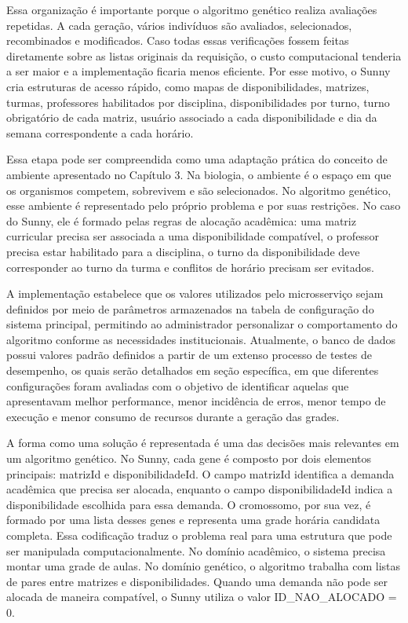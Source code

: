 Essa organização é importante porque o algoritmo genético realiza avaliações repetidas. A cada geração, vários indivíduos são avaliados, selecionados, recombinados e modificados. Caso todas essas verificações fossem feitas diretamente sobre as listas originais da requisição, o custo computacional tenderia a ser maior e a implementação ficaria menos eficiente. Por esse motivo, o Sunny cria estruturas de acesso rápido, como mapas de disponibilidades, matrizes, turmas, professores habilitados por disciplina, disponibilidades por turno, turno obrigatório de cada matriz, usuário associado a cada disponibilidade e dia da semana correspondente a cada horário.

Essa etapa pode ser compreendida como uma adaptação prática do conceito de ambiente apresentado no Capítulo 3. Na biologia, o ambiente é o espaço em que os organismos competem, sobrevivem e são selecionados. No algoritmo genético, esse ambiente é representado pelo próprio problema e por suas restrições. No caso do Sunny, ele é formado pelas regras de alocação acadêmica: uma matriz curricular precisa ser associada a uma disponibilidade compatível, o professor precisa estar habilitado para a disciplina, o turno da disponibilidade deve corresponder ao turno da turma e conflitos de horário precisam ser evitados.

A implementação estabelece que os valores utilizados pelo microsserviço sejam definidos por meio de parâmetros armazenados na tabela de configuração do sistema principal, permitindo ao administrador personalizar o comportamento do algoritmo conforme as necessidades institucionais. Atualmente, o banco de dados possui valores padrão definidos a partir de um extenso processo de testes de desempenho, os quais serão detalhados em seção específica, em que diferentes configurações foram avaliadas com o objetivo de identificar aquelas que apresentavam melhor performance, menor incidência de erros, menor tempo de execução e menor consumo de recursos durante a geração das grades.

A forma como uma solução é representada é uma das decisões mais relevantes em um algoritmo genético. No Sunny, cada gene é composto por dois elementos principais: matrizId e disponibilidadeId. O campo matrizId identifica a demanda acadêmica que precisa ser alocada, enquanto o campo disponibilidadeId indica a disponibilidade escolhida para essa demanda. O cromossomo, por sua vez, é formado por uma lista desses genes e representa uma grade horária candidata completa. Essa codificação traduz o problema real para uma estrutura que pode ser manipulada computacionalmente. No domínio acadêmico, o sistema precisa montar uma grade de aulas. No domínio genético, o algoritmo trabalha com listas de pares entre matrizes e disponibilidades. Quando uma demanda não pode ser alocada de maneira compatível, o Sunny utiliza o valor ID\_NAO\_ALOCADO = 0.

